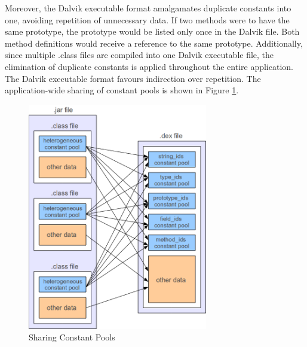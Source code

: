 Moreover, the Dalvik executable format amalgamates duplicate constants into one, avoiding repetition of unnecessary data. If two methods were to have the same prototype, the prototype would be listed only once in the Dalvik file. Both method definitions would receive a reference to the same prototype. Additionally, since multiple .class files are compiled into one Dalvik executable file, the elimination of duplicate constants is applied throughout the entire application. The Dalvik executable format favours indirection over repetition. The application-wide sharing of constant pools is shown in Figure \ref{fig:dex}.

\begin{figure}[h!]
    \centering
    \includegraphics[width=0.7\textwidth]{images/dex.png}
    \caption{Sharing Constant Pools}
    \label{fig:dex}
\end{figure}

